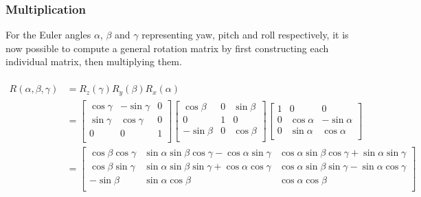 \documentclass[12pt, a4paper]{article}
\begin{document}
\subsubsection{Multiplication}

For the Euler angles $\alpha$, $\beta$ and $\gamma$ representing yaw, pitch and
roll respectively, it is now possible to compute a general rotation matrix by
first constructing each individual matrix, then multiplying them.

\begin{align*} \\
    R(\alpha, \beta, \gamma) & = R_z(\gamma) R_y(\beta) R_x(\alpha)                                                                                                \\
                             & = \begin{bmatrix}
                                     \cos \gamma & -\sin \gamma & 0 \\
                                     \sin \gamma & \cos \gamma  & 0 \\
                                     0           & 0            & 1 \\
                                 \end{bmatrix}
    \begin{bmatrix}
        \cos \beta  & 0 & \sin \beta \\
        0           & 1 & 0          \\
        -\sin \beta & 0 & \cos \beta \\
    \end{bmatrix}
    \begin{bmatrix}
        1 & 0           & 0            \\
        0 & \cos \alpha & -\sin \alpha \\
        0 & \sin \alpha & \cos \alpha  \\
    \end{bmatrix}                                                                                                                                 \\
                             & = \begin{bmatrix}
                                     \cos\beta\cos\gamma & \sin\alpha\sin\beta\cos\gamma - \cos\alpha\sin\gamma & \cos\alpha\sin\beta\cos\gamma + \sin\alpha\sin\gamma \\
                                     \cos\beta\sin\gamma & \sin\alpha\sin\beta\sin\gamma + \cos\alpha\cos\gamma & \cos\alpha\sin\beta\sin\gamma - \sin\alpha\cos\gamma \\
                                     -\sin\beta          & \sin\alpha\cos\beta                                  & \cos\alpha\cos\beta                                  \\
                                 \end{bmatrix}
\end{align*} \\
\end{document}
